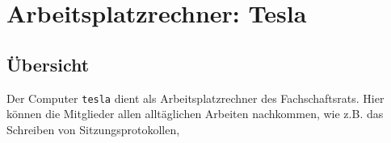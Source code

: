 \section{Arbeitsplatzrechner: Tesla}
\subsection{Übersicht}

Der Computer \texttt{tesla} dient als Arbeitsplatzrechner des Fachschaftsrats. Hier können die Mitglieder allen alltäglichen Arbeiten nachkommen, wie z.B. das Schreiben von Sitzungsprotokollen,

